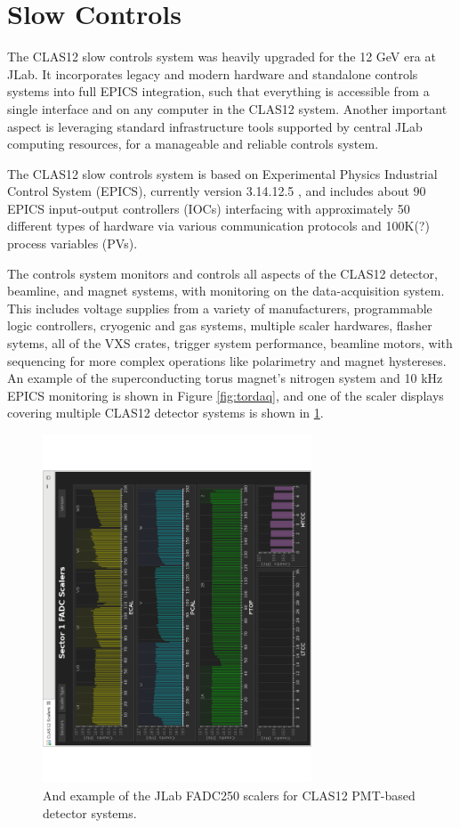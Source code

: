 \section{Slow Controls}

The CLAS12 slow controls system was heavily upgraded for the 12 GeV era at JLab.  It incorporates legacy and modern hardware and standalone controls systems into full EPICS integration, such that everything is accessible from a single interface and on any computer in the CLAS12 system.  Another important aspect is leveraging standard infrastructure tools supported by central JLab computing resources, for a manageable and reliable controls system.

The CLAS12 slow controls system is based on Experimental Physics Industrial Control System (EPICS), currently version 3.14.12.5 \cite{epics-website}, and includes about 90 EPICS input-output controllers (IOCs) interfacing with approximately 50 different types of hardware via various communication protocols and 100K(?) process variables (PVs).

The controls system monitors and controls all aspects of the CLAS12 detector, beamline, and magnet systems, with monitoring on the data-acquisition system.  This includes voltage supplies from a variety of manufacturers, programmable logic controllers, cryogenic and gas systems, multiple scaler hardwares, flasher sytems, all of the VXS crates, trigger system performance, beamline motors, with sequencing for more complex operations like polarimetry and magnet hystereses.  An example of the superconducting torus magnet's nitrogen system and 10 kHz EPICS monitoring is shown in Figure \ref{fig:tordaq}, and one of the scaler displays covering multiple CLAS12 detector systems is shown in \ref{fig:jlabscalers}.

\begin{figure}[htbp]\centering
\includegraphics[angle=270,width=8cm]{img/fd-scalers}
\caption{And example of the JLab FADC250 scalers for CLAS12 PMT-based detector systems.\label{fig:jlabscalers}}
\end{figure}

